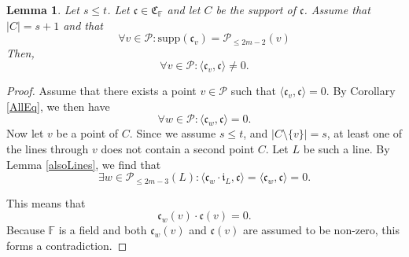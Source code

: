 \documentclass[12pt]{article}
\newcommand{\F}{\mathbb{F}}
\newcommand{\Points}{\mathcal{P}}
\newcommand{\Code}{\mathfrak{C}_\F}
\renewcommand{\i}{\mathfrak{i}}
\renewcommand{\c}{\mathfrak{c}}
\newcommand{\cv}{\mathfrak{c}_{v}}
\newtheorem{lemma}{Lemma}
\theoremstyle{remark}
\begin{document}
\begin{lemma}\label{neverEmpty} Let $s\leq t$.
	Let \(\c\in \Code\) and let \(C\) be the support of \(\c\). Assume that \(|C|=s+1\) and that  
	\[\forall v\in \Points: \text{supp}(\c_v) = \Points_{\leq 2m-2}(v)\]
	Then,
	\[\forall v\in \Points: \langle \c_v ,\c\rangle \neq 0.\]
\end{lemma}
\begin{proof}
	Assume that there exists a point \(v\in \Points\) such that \(\langle \cv ,\c\rangle = 0\). By Corollary \ref{AllEq}, we then have \[\forall w\in \Points: \langle \c_w ,\c\rangle = 0.\] Now let \(v\) be a point of \(C\). Since we assume \(s\le t\), and \(|C\setminus\{v\}| = s\), at least one of the lines through \(v\) does not contain a second point \(C\). Let \(L\) be such a line. By Lemma \ref{alsoLines}, we find that 
	\[\exists w \in \Points_{\le 2m-3}(L): \langle \c_w\cdot \i_L ,\c\rangle = \langle \c_w,\c\rangle = 0.\] 
    
	This means that 
	\[\c_w(v)\cdot\c(v) = 0.\]
	Because \(\F\) is a field and both \(\c_w(v)\) and \(\c(v)\) are assumed to be non-zero, this forms a contradiction.
\end{proof}

\end{document}
